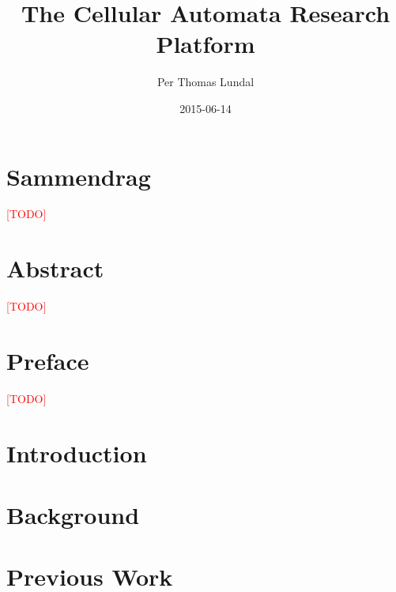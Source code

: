 \documentclass[a4paper,twoside,12pt]{book}
\title{
    {The Cellular Automata Research Platform}\\
    \TODO
}
\author{Per Thomas Lundal}
\date{2015-06-14}
\newcommand\TODO{\textcolor{red}{[TODO]}}
\begin{document}
\maketitle

\clearpage
\null
{}
\newpage


\cleardoublepage
{}
{}
\chapter*{Sammendrag}
    \TODO

\cleardoublepage
{}
{}
\chapter*{Abstract}
    \TODO

\cleardoublepage
{}
{}
\chapter*{Preface}
    \TODO

\setcounter{tocdepth}{2}

\cleardoublepage
{}
{}
\tableofcontents

\cleardoublepage
{}
{}
\listoffigures

\cleardoublepage
{}
{}
\listoftables


\chapter{Introduction}
    \label{ch:introduction}
    

\chapter{Background}
    \label{ch:background}
    

\chapter{Previous Work}
    \label{ch:previous-work}
    
\end{document}
